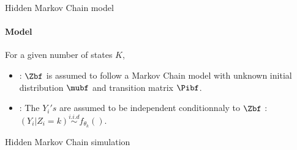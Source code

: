\begin{frame}[fragile]{Hidden Markov Chain model}
\paragraph{Model}
For a given number of states $K$, 
\begin{itemize}
\item
 : $\Zbf$ is assumed to follow a Markov Chain model with unknown initial distribution $\mubf$ and transition matrix  $\Pibf$.
 \item {}: The $Y_i's$ are assumed to be independent  conditionnaly to $\Zbf$ : $(Y_i\vert Z_i = k) \overset{i.i.d}{\sim} f_{\theta_k}().$
\end{itemize}
\end{frame}

\begin{frame}[fragile]{Hidden Markov Chain simulation}
\begin{columns}
\begin{column}{0.5\textwidth}
\begin{knitrout}
\color{fgcolor}\begin{kframe}
\begin{alltt}
 \hlkwb{<-} \hlstd{(}\hlstd{,} \hlstd{)}
 \hlkwb{<-} \hlstd{(}\hlstd{,}\hlstd{)}
 \hlkwb{<-}   
 \hlstd{=}\hlstd{)}
 \hlstd{=}\hlstd{,} \hlopt{+}\hlstd{)}
\end{alltt}
\end{kframe}
\end{knitrout}
\end{column}
\begin{column}{0.4\textwidth}
\end{column}
\end{columns}
\end{frame}


